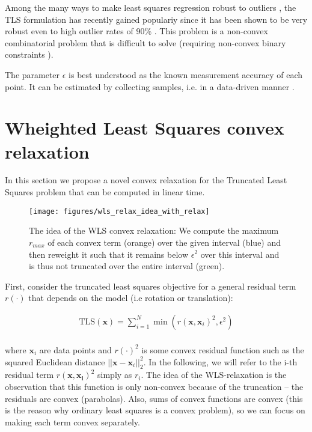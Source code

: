 Among the many ways to make least squares regression robust to outliers \cite[Ch. 3]{elements-of-stats-learning-book}, the TLS formulation has recently gained populariy \cite{Yang20tro-teaser, 9785843, NIPS2017_9f53d83e, doi:10.1080/10618600.2017.1390471, NIPS2010_01882513} since it has been shown to be very robust even to high outlier rates of 90\% \cite{Yang20tro-teaser}.
This problem is a non-convex combinatorial problem that is difficult to solve (requiring non-convex binary constraints \cite{5459398}).

The parameter $\epsilon$ is best understood as the known measurement accuracy of each point. It can be estimated by collecting samples, i.e. in a data-driven manner \cite[p.8]{Chin2017TheMC}.


\section{Wheighted Least Squares convex relaxation}

In this section we propose a novel convex relaxation for the Truncated Least Squares problem that can be computed in linear time.

\begin{figure}[!ht]
	\centering
	\texttt{[image: figures/wls\_relax\_idea\_with\_relax]}
	\caption{The idea of the WLS convex relaxation: We compute the maximum $r_{max}$ of each convex term (orange) over the given interval (blue) and then reweight it such that it remains below $\epsilon^2$ over this interval and is thus not truncated over the entire interval (green).}
	\label{fig:wlsrelaxideawithrelax}
\end{figure}

First, consider the truncated least squares objective for a general residual term $r(\cdot)$ that depends on the model (i.e rotation or translation): 

\begin{equation}
	\label{eq:tls-scalar-for-wls}
	\begin{aligned}
		\text{TLS}(\mathbf{x}) = \sum_{i=1}^{N} \min \left(r(\mathbf{x}, \mathbf{x}_i)^2, \epsilon^2 \right)\\
	\end{aligned}
\end{equation}

where $\mathbf{x}_i$ are data points and $r(\cdot)^2$ is some convex residual function such as the squared Euclidean distance $||\mathbf{x} - \mathbf{x}_i||_2^2$. In the following, we will refer to the i-th residual term $r(\mathbf{x}, \mathbf{x_i})^2$ simply as $r_i$.
The idea of the WLS-relaxation is the observation that this function is only non-convex because of the truncation -- the residuals are convex (parabolas). Also, sums of convex functions are convex (this is the reason why ordinary least squares is a convex problem), so we can focus on making each term convex separately.

